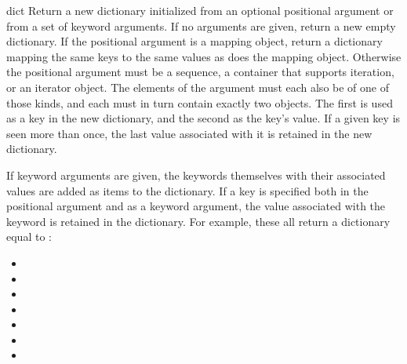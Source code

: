 \begin{funcdesc}{dict}{}
  Return a new dictionary initialized from an optional positional
  argument or from a set of keyword arguments.
  If no arguments are given, return a new empty dictionary.
  If the positional argument  is a mapping object, return a dictionary
  mapping the same keys to the same values as does the mapping object.
  Otherwise the positional argument must be a sequence, a container that
  supports iteration, or an iterator object.  The elements of the argument
  must each also be of one of those kinds, and each must in turn contain
  exactly two objects.  The first is used as a key in the new dictionary,
  and the second as the key's value.  If a given key is seen more than
  once, the last value associated with it is retained in the new
  dictionary.

  If keyword arguments are given, the keywords themselves with their
  associated values are added as items to the dictionary. If a key
  is specified both in the positional argument and as a keyword argument,
  the value associated with the keyword is retained in the dictionary.
  For example, these all return a dictionary equal to
  :

  \begin{itemize}
    \item {}
    \item {}
    \item {}
    \item {}
    \item {}
    \item {}
    \item {}
  \end{itemize}

\end{funcdesc}

